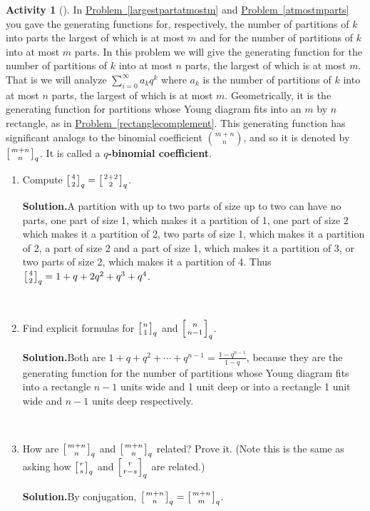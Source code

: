 \documentclass[10pt,]{book}
\newcommand{\terminology}[1]{\textbf{#1}}
\theoremstyle{plain}
\theoremstyle{definition}
\newtheorem{activity}[project]{Activity}
\numberwithin{equation}{chapter}
\newcommand{\qchoose}[2]{\left[{#1\atop#2}\right]_q}
\begin{document}
\begin{activity}[]\label{qtorialformula}
In \hyperref[largestpartatmostm]{Problem~\ref{largestpartatmostm}} and \hyperref[atmostmparts]{Problem~\ref{atmostmparts}} you gave the generating functions for, respectively, the number of partitions of \(k\) into parts the largest of which is at most \(m\) and for the number of partitions of \(k\) into at most \(m\) parts. In this problem we will give the generating function for the number of partitions of \(k\) into at most \(n\) parts, the largest of which is at most \(m\). That is we will analyze \(\sum_{i=0}^\infty a_kq^k\) where \(a_k\) is the number of partitions of \(k\) into at most \(n\) parts, the largest of which is at most \(m\). Geometrically, it is the generating function for partitions whose Young diagram fits into an \(m\) by \(n\) rectangle, as in \hyperref[rectanglecomplement]{Problem~\ref{rectanglecomplement}}. This generating function has significant analogs to the binomial coefficient \(\binom{m+n}{n}\), and so it is denoted by \(\qchoose{m+n}{n}\). It is called a \terminology{\(q\)-binomial coefficient}.%
~\par
\begin{enumerate}[label=(\alph*)]
 \item Compute \(\qchoose{4}{2}=\qchoose{2+2}{2}\).%
\par\medskip\noindent%
\textbf{Solution.}\quad A partition with up to two parts of size up to two can have no parts, one part of size 1, which makes it a partition of 1, one part of size 2 which makes it a partition of 2, two parts of size 1, which makes it a partition of 2, a part of size 2 and a part of size 1, which makes it a partition of 3, or two parts of size 2, which makes it a partition of 4. Thus \(\qchoose{4}{2}=1+q+2q^2+q^3+q^4\).%

~\par
\item Find explicit formulas for \(\qchoose{n}{1}\) and \(\qchoose{n}{n-1}\).%
\par\medskip\noindent%
\textbf{Solution.}\quad Both are \(1+q+q^2+\cdots+q^{n-1} = \frac{1-q^{n-1}}{1-q}\), because they are the generating function for the number of partitions whose Young diagram fits into a rectangle \(n-1\) units wide and 1 unit deep or into a rectangle 1 unit wide and \(n-1\) units deep respectively.%

~\par
\item How are \(\qchoose{m+n}{n}\) and \(\qchoose{m+n}{n}\) related? Prove it. (Note this is the same as asking how \(\qchoose{r}{s}\) and \(\qchoose{r}{r-s}\) are related.)%
\par\medskip\noindent%
\textbf{Solution.}\quad By conjugation, \(\qchoose{m+n}{n}=\qchoose{m+n}{m}\).%


\end{enumerate}
\end{activity}
\end{document}
